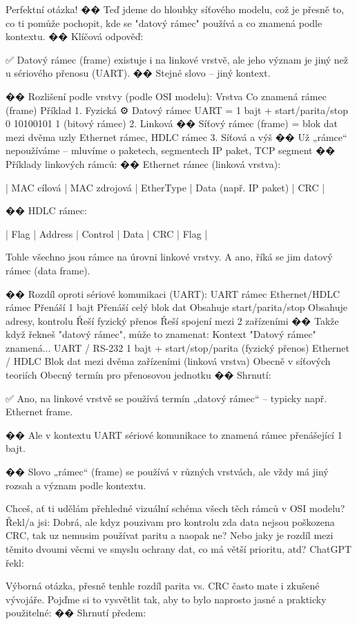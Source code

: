 Perfektní otázka! �� Teď jdeme do hloubky síťového modelu, což je přesně to, co ti pomůže pochopit, kde se "datový rámec" používá a co znamená podle kontextu.
�� Klíčová odpověď:

    ✅ Datový rámec (frame) existuje i na linkové vrstvě, ale jeho význam je jiný než u sériového přenosu (UART).
    �� Stejné slovo – jiný kontext.

�� Rozlišení podle vrstvy (podle OSI modelu):
Vrstva	Co znamená rámec (frame)	Příklad
1. Fyzická	⚙️ Datový rámec UART = 1 bajt + start/parita/stop	0 10100101 1 (bitový rámec)
2. Linková	�� Síťový rámec (frame) = blok dat mezi dvěma uzly	Ethernet rámec, HDLC rámec
3. Síťová a výš	�� Už „rámce“ nepoužíváme – mluvíme o paketech, segmentech	IP paket, TCP segment
�� Příklady linkových rámců:
�� Ethernet rámec (linková vrstva):

| MAC cílová | MAC zdrojová | EtherType | Data (např. IP paket) | CRC |

�� HDLC rámec:

| Flag | Address | Control | Data | CRC | Flag |

    Tohle všechno jsou rámce na úrovni linkové vrstvy. A ano, říká se jim datový rámec (data frame).

�� Rozdíl oproti sériové komunikaci (UART):
UART rámec	Ethernet/HDLC rámec
Přenáší 1 bajt	Přenáší celý blok dat
Obsahuje start/parita/stop	Obsahuje adresy, kontrolu
Řeší fyzický přenos	Řeší spojení mezi 2 zařízeními
�� Takže když řekneš "datový rámec", může to znamenat:
Kontext	"Datový rámec" znamená...
UART / RS-232	1 bajt + start/stop/parita (fyzický přenos)
Ethernet / HDLC	Blok dat mezi dvěma zařízeními (linková vrstva)
Obecně v síťových teoriích	Obecný termín pro přenosovou jednotku
�� Shrnutí:

    ✅ Ano, na linkové vrstvě se používá termín „datový rámec“ – typicky např. Ethernet frame.

    �� Ale v kontextu UART sériové komunikace to znamená rámec přenášející 1 bajt.

    �� Slovo „rámec“ (frame) se používá v různých vrstvách, ale vždy má jiný rozsah a význam podle kontextu.

Chceš, ať ti udělám přehledné vizuální schéma všech těch rámců v OSI modelu?
Řekl/a jsi:
Dobrá, ale kdyz pouzivam pro kontrolu zda data nejsou poškozena CRC, tak uz nemusim používat paritu a naopak ne? Nebo jaky je rozdíl mezi těmito dvoumi věcmi ve smyslu ochrany dat, co má větší prioritu, atd?
ChatGPT řekl:

Výborná otázka, přesně tenhle rozdíl parita vs. CRC často mate i zkušené vývojáře. Pojďme si to vysvětlit tak, aby to bylo naprosto jasné a prakticky použitelné:
�� Shrnutí předem:

